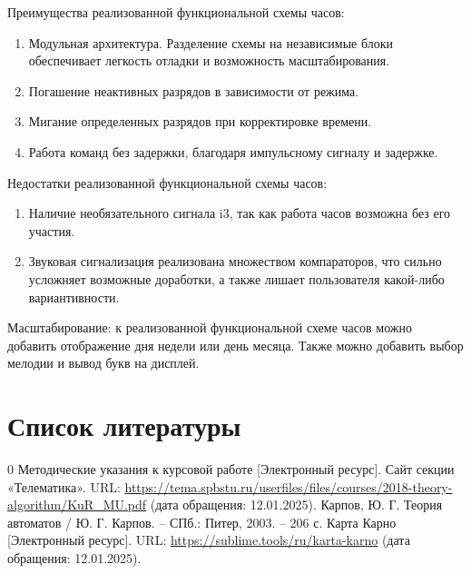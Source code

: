 \documentclass[11pt,a4paper,final]{article}
\begin{document}
	\noindent Преимущества реализованной функциональной схемы часов:
	\begin{enumerate}
		\item Модульная архитектура. Разделение схемы на независимые блоки обеспечивает легкость отладки и возможность масштабирования.
		\item Погашение неактивных разрядов в зависимости от режима.
		\item Мигание определенных разрядов при корректировке времени.
		\item Работа команд без задержки, благодаря импульсному сигналу и задержке.
	\end{enumerate}
	Недостатки реализованной функциональной схемы часов:
	\begin{enumerate}
		\item Наличие необязательного сигнала i3, так как работа часов возможна без его участия. 
		\item Звуковая сигнализация реализована множеством компараторов, что сильно усложняет возможные доработки, а также лишает пользователя какой-либо вариантивности.
	\end{enumerate}
	Масштабирование: к реализованной функциональной схеме часов можно добавить отображение дня недели или день месяца. Также можно добавить выбор мелодии и вывод букв на дисплей.\\
	
	
	\newpage
	\section*{Список литературы}
	
	\begin{thebibliography}{0}
		 Методические указания к курсовой работе [Электронный ресурс]. Сайт секции «Телематика». URL: \href{https://tema.spbstu.ru/userfiles/files/courses/2018-theory-algorithm/KuR_MU.pdf}{https://tema.spbstu.ru/userfiles/files/courses/2018-theory-algorithm/KuR\_MU.pdf} (дата обращения: 12.01.2025).
		 Карпов, Ю. Г. Теория автоматов / Ю. Г. Карпов. – СПб.: Питер, 2003. – 206 с.
		 Карта Карно [Электронный ресурс]. URL: \href{https://sublime.tools/ru/karta-karno}{https://sublime.tools/ru/karta-karno} (дата обращения: 12.01.2025).
	\end{thebibliography}
	
	\newpage
	\label {func scheme}
	
	
	
	
	
\end{document}
